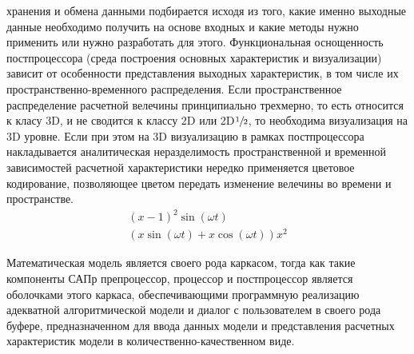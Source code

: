 хранения и обмена данными подбирается исходя из того, какие именно выходные
данные необходимо получить на основе входных и какие методы нужно применить или
нужно разработать для этого. Функциональная оснощенность постпроцессора (среда
построения основных характеристик и визуализации) зависит от особенности
представления выходных характеристик, в том числе их пространственно-временного 
распределения. Если пространственное распределение расчетной велечины 
принципиально трехмерно, то есть относится к класу 3D, и не сводится к классу 2D или 
2D$\sfrac{1}{2}$, то необходима визуализация на 3D уровне. Если при этом на 3D
визуализацию в рамках постпроцессора накладывается аналитическая неразделимость
пространственной и временной зависимостей расчетной характеристики нередко
применяется цветовое кодирование, позволяющее цветом передать изменение велечины
во времени и пространстве. 
\begin{gather*}	
	(x-1)^2\sin(\omega t) \\
	(x\sin(\omega t) + x\cos(\omega t))x^2
\end{gather*}\par
Математическая модель является своего рода каркасом, тогда как такие компоненты
САПр препроцессор, процессор и постпроцессор является оболочками этого каркаса,
обеспечивающими программную реализацию адекватной алгоритмической модели и
диалог с пользователем в своего рода буфере, предназначенном для ввода данных
модели и представления расчетных характеристик модели в
количественно-качественном виде.



